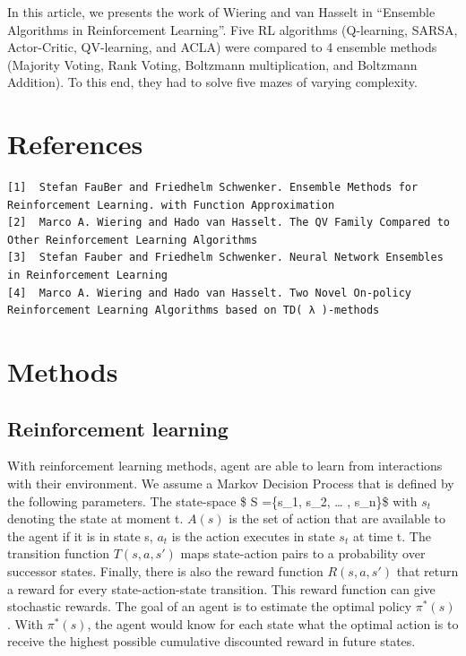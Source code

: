 In this article, we presents the work of Wiering and van Hasselt in
``Ensemble Algorithms in Reinforcement Learning''. Five RL algorithms
(Q-learning, SARSA, Actor-Critic, QV-learning, and ACLA) were compared
to 4 ensemble methods (Majority Voting, Rank Voting, Boltzmann
multiplication, and Boltzmann Addition). To this end, they had to solve
five mazes of varying complexity.

\hypertarget{references}{%
\section{References}\label{references}}

\begin{verbatim}
[1]  Stefan FauBer and Friedhelm Schwenker. Ensemble Methods for Reinforcement Learning. with Function Approximation
[2]  Marco A. Wiering and Hado van Hasselt. The QV Family Compared to Other Reinforcement Learning Algorithms
[3]  Stefan Fauber and Friedhelm Schwenker. Neural Network Ensembles in Reinforcement Learning
[4]  Marco A. Wiering and Hado van Hasselt. Two Novel On-policy Reinforcement Learning Algorithms based on TD( λ )-methods
\end{verbatim}

\hypertarget{methods}{%
\section{Methods}\label{methods}}

\hypertarget{reinforcement-learning}{%
\subsection{Reinforcement learning}\label{reinforcement-learning}}

With reinforcement learning methods, agent are able to learn from
interactions with their environment. We assume a Markov Decision Process
that is defined by the following parameters. The state-space \$ S
=\{s\_1, s\_2, \ldots{} , s\_n\}\$ with \(s_t\) denoting the state at
moment t. \(A(s)\) is the set of action that are available to the agent
if it is in state s, \(a_t\) is the action executes in state \(s_t\) at
time t. The transition function \(T(s,a,s')\) maps state-action pairs to
a probability over successor states. Finally, there is also the reward
function \(R(s,a,s')\) that return a reward for every state-action-state
transition. This reward function can give stochastic rewards. The goal
of an agent is to estimate the optimal policy \(\pi^*(s)\). With
\(\pi^*(s)\), the agent would know for each state what the optimal
action is to receive the highest possible cumulative discounted reward
in future states.

